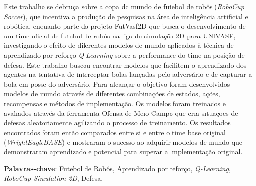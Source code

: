 


\setlength{\absparsep}{18pt} %
\begin{resumo}


Este trabalho se debruça sobre a copa do mundo de futebol de robôs
(\textit{RoboCup Soccer}), que incentiva a produção de pesquisas na área de
inteligência artificial e robótica, enquanto parte do projeto FutVasf2D que
busca o desenvolvimento de um time oficial de futebol de robôs na liga de
simulação 2D para UNIVASF, investigando o efeito de diferentes modelos
de mundo aplicados à técnica de aprendizado por reforço \textit{Q-Learning}
sobre a performance do time na posição de defesa. Este trabalho buscou encontrar
modelos que facilitem o aprendizado dos agentes na tentativa de interceptar
bolas lançadas pelo adversário e de capturar a bola em posse do adversário. Para
alcançar o objetivo foram desenvolvidos modelos de mundo através de diferentes
combinações de estados, ações, recompensas e métodos de implementação. Os
modelos foram treinados e avaliados através da ferramenta Ofensa de Meio Campo que cria situações
de defesas aleatoriamente agilizando o processo de treinamento. Os resultados
encontrados foram então comparados entre si e entre o time base original
(\textit{WrightEagleBASE}) e mostraram o sucesso ao adquirir modelos de mundo
que demonstraram aprendizado e potencial para superar a implementação original.


 \textbf{Palavras-chave}: Futebol de Robôs, Aprendizado por reforço, \textit{Q-Learning}, \textit{RoboCup Simulation 2D}, Defesa.

\end{resumo}

